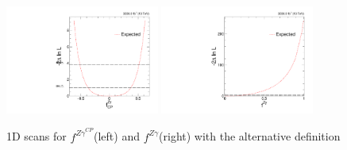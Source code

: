 \documentclass[10pt,a4paper]{article}
\begin{document}
\begin{figure}[t]
\centering
\includegraphics[width=0.45\textwidth]{./output_alt_fzgcp.pdf}
\includegraphics[width=0.45\textwidth]{./output_alt_fzg.pdf}
\caption{1D scans for $f^{Z\gamma}^{CP}$(left) and $f^{Z\gamma}$(right) with the alternative definition}
\label{fig:_fzg_fzgcp}
\end{figure}






\\
\\
\\
\end{document}
